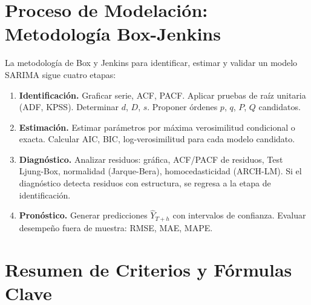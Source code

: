 \documentclass[12pt, a4paper]{article}
\begin{document}
\section{Proceso de Modelación: Metodología Box-Jenkins}

La metodología de Box y Jenkins para identificar, estimar y validar un modelo
SARIMA sigue cuatro etapas:

\begin{enumerate}
  \item \textbf{Identificación.}
        Graficar serie, ACF, PACF. Aplicar pruebas de raíz unitaria (ADF, KPSS).
        Determinar $d$, $D$, $s$. Proponer órdenes $p$, $q$, $P$, $Q$ candidatos.

  \item \textbf{Estimación.}
        Estimar parámetros por máxima verosimilitud condicional o exacta.
        Calcular AIC, BIC, log-verosimilitud para cada modelo candidato.

  \item \textbf{Diagnóstico.}
        Analizar residuos: gráfica, ACF/PACF de residuos, Test Ljung-Box,
        normalidad (Jarque-Bera), homocedasticidad (ARCH-LM).
        Si el diagnóstico detecta residuos con estructura, se regresa a la etapa
        de identificación.

  \item \textbf{Pronóstico.}
        Generar predicciones $\hat{Y}_{T+h}$ con intervalos de confianza.
        Evaluar desempeño fuera de muestra: RMSE, MAE, MAPE.
\end{enumerate}

\section{Resumen de Criterios y Fórmulas Clave}
\end{document}
